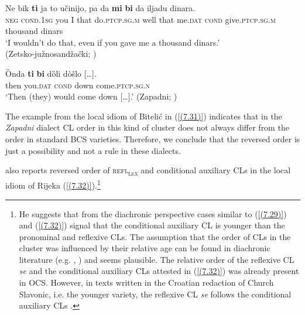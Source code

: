 \begin{exe}\ex\label{(7.29)}
\gll Ne bik \textbf{ti} ja  to učinijo, pa da \textbf{mi} \textbf{bi} da  iljadu  dinara. \\
\textsc{neg} \textsc{cond}.1\textsc{sg} you I that do.\textsc{ptcp.sg.m} well that me.\textsc{dat}  \textsc{cond} give.\textsc{ptcp.sg.m} thousand dinars \\
\glt ‘I wouldn’t do that, even if you gave me a thousand dinars.’ \\
\hfill  (Zetsko-južnosandžački; \citealt[180]{Okuka08})

\ex\label{(7.30)}
\gll Ȍnda  \textbf{ti}  \textbf{bi}  dȍli  {dòšlo [\dots].} \\
then you.\textsc{dat} \textsc{cond} down come.\textsc{ptcp.sg.n} \\
\glt ‘Then (they) would come down [\dots].’
\hfill  (Zapadni; \citealt[309]{Curkovic14})
\end{exe}

\noindent The example from the local idiom of Bitelić in (\ref{(7.31)}) indicates that in the \textit{Zapadni} dialect CL order in this kind of cluster does not always differ from the order in standard BCS varieties. Therefore, we conclude that the reversed order is just a possibility and not a rule in these dialects.


\noindent \citet[209]{Pesikan65} also reports reversed order of \textsc{refl\textsubscript{lex}} and conditional auxiliary CLs in the local idiom of Rijeka (\ref{(7.32)}).\footnote{He suggests that from the diachronic perspective cases similar to (\ref{(7.29)}) and (\ref{(7.32)}) signal that the conditional auxiliary CL is younger than the pronominal and reflexive CLs. The assumption that the order of CLs in the cluster was influenced by their relative age can be found in diachronic literature (e.g. \citealt[95]{Grickat72}, \citealt[189]{ZimmerlingKosta13}) and seems plausible. The relative order of the reflexive CL \textit{se} and the conditional auxiliary CLs attested in (\ref{(7.32)}) was already present in OCS. However, in texts written in the Croatian redaction of Church Slavonic, i.e. the younger variety, the reflexive CL \textit{se} follows the conditional auxiliary CLs \citep[cf.][318]{GKMPRSV14}.}

